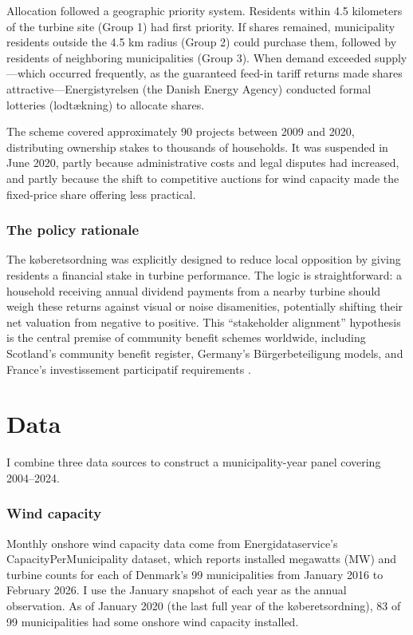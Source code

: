 \documentclass[12pt]{article}
\begin{document}
Allocation followed a geographic priority system. Residents within 4.5 kilometers of the turbine site (Group 1) had first priority. If shares remained, municipality residents outside the 4.5 km radius (Group 2) could purchase them, followed by residents of neighboring municipalities (Group 3). When demand exceeded supply---which occurred frequently, as the guaranteed feed-in tariff returns made shares attractive---Energistyrelsen (the Danish Energy Agency) conducted formal lotteries (lodt\ae kning) to allocate shares.

The scheme covered approximately 90 projects between 2009 and 2020, distributing ownership stakes to thousands of households. It was suspended in June 2020, partly because administrative costs and legal disputes had increased, and partly because the shift to competitive auctions for wind capacity made the fixed-price share offering less practical.

\subsubsection*{The policy rationale} The k{\o}beretsordning was explicitly designed to reduce local opposition by giving residents a financial stake in turbine performance. The logic is straightforward: a household receiving annual dividend payments from a nearby turbine should weigh these returns against visual or noise disamenities, potentially shifting their net valuation from negative to positive. This ``stakeholder alignment'' hypothesis is the central premise of community benefit schemes worldwide, including Scotland's community benefit register, Germany's B\"urgerbeteiligung models, and France's investissement participatif requirements \citep{Bauwens2016, MusallKuik2011, Walker2008}.


\section{Data}

I combine three data sources to construct a municipality-year panel covering 2004--2024.

\subsubsection*{Wind capacity} Monthly onshore wind capacity data come from Energidataservice's CapacityPerMunicipality dataset, which reports installed megawatts (MW) and turbine counts for each of Denmark's 99 municipalities from January 2016 to February 2026. I use the January snapshot of each year as the annual observation. As of January 2020 (the last full year of the k{\o}beretsordning), 83 of 99 municipalities had some onshore wind capacity installed.
\end{document}

